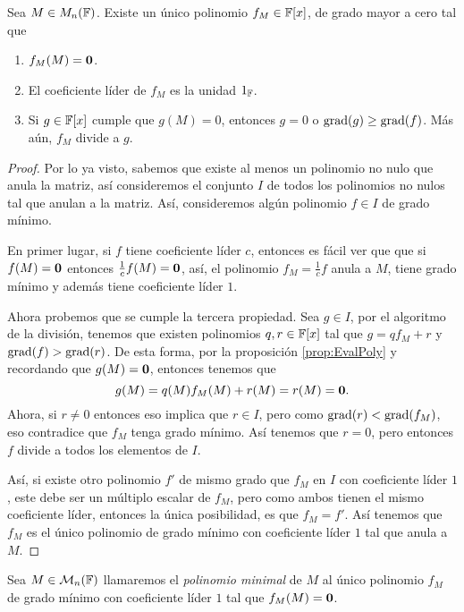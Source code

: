 \begin{teor}\label{teor:UnicidadPMin}
  Sea $M \in M_n(\mathbb{F})$. Existe un único polinomio $f_M \in \mathbb{F}[x]$, de grado mayor a cero tal que
  \begin{enumerate}
    \item $f_M(M) = \mathbf{0}$.
    \item El coeficiente líder de $f_M$ es la unidad $1_{\mathbb{F}}$.
    \item Si $g \in \mathbb{F}[x]$ cumple que $g(M) = 0$, entonces $g = 0$ o $\operatorname{grad}(g) \geq \operatorname{grad}(f)$. Más aún, $f_M$ divide a $g$.
  \end{enumerate}
\end{teor}
\begin{proof}
  Por lo ya visto, sabemos que existe al menos un polinomio no nulo que anula la matriz, así consideremos el conjunto $I$ de todos los polinomios no nulos tal que anulan a la matriz. Así, consideremos algún polinomio $f \in I$ de grado mínimo.

  En primer lugar, si $f$ tiene coeficiente líder $c$, entonces es fácil ver que que si $f(M) = \mathbf{0}$ entonces $\frac{1}{c} f (M) = \mathbf{0}$, así, el polinomio $f_M = \frac{1}{c} f$ anula a $M$, tiene grado mínimo y además tiene coeficiente líder $1$.

  Ahora probemos que se cumple la tercera propiedad. Sea $g \in I$, por el algoritmo de la división, tenemos que existen polinomios $q,r \in \mathbb{F}[x]$ tal que $g = qf_M+r$ y $\operatorname{grad}(f) > \operatorname{grad}(r)$. De esta forma, por la proposición \ref{prop:EvalPoly} y recordando que $g(M) = \mathbf{0}$, entonces tenemos que
  \[
    g(M) = q(M) f_M(M) + r(M) = r(M) = \mathbf{0}.
  \]
  Ahora, si $r \neq 0$ entonces eso implica que $r \in I$, pero como $\operatorname{grad}(r) < \operatorname{grad}(f_M)$, eso contradice que $f_M$ tenga grado mínimo. Así tenemos que $r = 0$, pero entonces $f$ divide a todos los elementos de $I$.
  
  Así, si existe otro polinomio $f'$ de mismo grado que $f_M$ en $I$ con coeficiente líder $1$, este debe ser un múltiplo escalar de $f_M$, pero como ambos tienen el mismo coeficiente líder, entonces la única posibilidad, es que $f_M = f'$. Así tenemos que $f_M$ es el único polinomio de grado mínimo con coeficiente líder $1$ tal que anula a $M$.
\end{proof}

\begin{defi}
  Sea $M \in \mathcal{M}_n(\mathbb{F})$ llamaremos el \emph{polinomio minimal} de $M$ al único polinomio $f_M$ de grado mínimo con coeficiente líder $1$ tal que $f_M(M) = \mathbf{0}$.
\end{defi}

